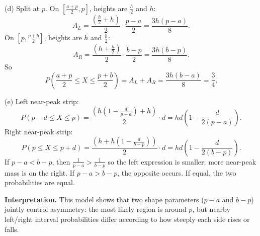 (d) Split at $p$.
On $\left[\frac{a+p}{2},p\right]$, heights are $\frac h2$ and $h$:
\[
A_L=\frac{\left(\frac h2+h\right)}{2}\cdot\frac{p-a}{2}=\frac{3h(p-a)}{8}.
\]
On $\left[p,\frac{p+b}{2}\right]$, heights are $h$ and $\frac h2$:
\[
A_R=\frac{\left(h+\frac h2\right)}{2}\cdot\frac{b-p}{2}=\frac{3h(b-p)}{8}.
\]
So
\[
P\!\left(\frac{a+p}{2}\le X\le\frac{p+b}{2}\right)=A_L+A_R=\frac{3h(b-a)}{8}=\frac34.
\]

(e) Left near-peak strip:
\[
P(p-d\le X\le p)=\frac{\left(h\left(1-\frac{d}{p-a}\right)+h\right)}{2}\cdot d
=hd\left(1-\frac{d}{2(p-a)}\right).
\]
Right near-peak strip:
\[
P(p\le X\le p+d)=\frac{\left(h+h\left(1-\frac{d}{b-p}\right)\right)}{2}\cdot d
=hd\left(1-\frac{d}{2(b-p)}\right).
\]
If $p-a<b-p$, then $\frac{1}{p-a}>\frac{1}{b-p}$ so the left expression is smaller; more near-peak mass is on the right. If $p-a>b-p$, the opposite occurs. If equal, the two probabilities are equal.

\textbf{Interpretation.}
This model shows that two shape parameters ($p-a$ and $b-p$) jointly control asymmetry: the most likely region is around $p$, but nearby left/right interval probabilities differ according to how steeply each side rises or falls.


